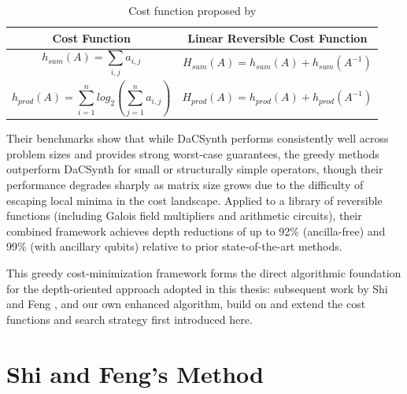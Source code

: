 \begin{table}
    \centering
    \begin{tabularx}{\textwidth}{C|C}
        \hline
        Cost Function  & Linear Reversible Cost Function\\
         \hline
         $$h_{sum}(A) = \sum_{i,j}a_{i,j}$$ & $$H_{sum}(A) = h_{sum}(A) + h_{sum}(A^{-1})$$\\
         \hline
         $$h_{prod}(A) = \sum_{i=1}^{n}log_{2}(\sum_{j=1}^{n}a_{i,j})$$ & $$H_{prod}(A) = h_{prod}(A) + h_{prod}(A^{-1})$$\\
    \hline
\end{tabularx}
    \caption{Cost function proposed by \cite{10.1145/3474226}}
    \label{tab:cost-function}
\end{table}

Their benchmarks show that while DaCSynth performs consistently well across problem sizes and provides strong worst-case guarantees, the greedy methods outperform DaCSynth for small or structurally simple operators, though their performance degrades sharply as matrix size grows due to the difficulty of escaping local minima in the cost landscape. Applied to a library of reversible functions (including Galois field multipliers and arithmetic circuits), their combined framework achieves depth reductions of up to 92\% (ancilla-free) and 99\% (with ancillary qubits) relative to prior state-of-the-art methods.

This greedy cost-minimization framework forms the direct algorithmic foundation for the depth-oriented approach adopted in this thesis: subsequent work by Shi and Feng \cite{cryptoeprint:2024/381}, and our own enhanced algorithm, build on and extend the cost functions and search strategy first introduced here.

\section{Shi and Feng's Method}

